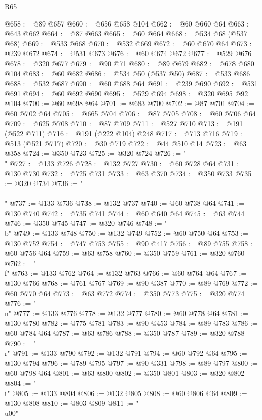 \begin{lexlean}{R65}
\begin{coremodule}
@658 := @89 @657
@660 := @656 @658 @104
@662 := @60 @660 @64
@663 := @643 @662
@664 := @87 @663
@665 := @60 @664
@668 := @534 @68 (@537 @68)
@669 := @533 @668
@670 := @532 @669
@672 := @60 @670 @64
@673 := @239 @672
@674 := @531 @673
@676 := @60 @674 @672
@677 := @529 @676
@678 := @320 @677
@679 := @90 @71
@680 := @89 @679
@682 := @678 @680 @104
@683 := @60 @682
@686 := @534 @50 (@537 @50)
@687 := @533 @686
@688 := @532 @687
@690 := @60 @688 @64
@691 := @239 @690
@692 := @531 @691
@694 := @60 @692 @690
@695 := @529 @694
@698 := @320 @695 @92 @104
@700 := @60 @698 @64
@701 := @683 @700
@702 := @87 @701
@704 := @60 @702 @64
@705 := @665 @704
@706 := @87 @705
@708 := @60 @706 @64
@709 := @625 @708
@710 := @87 @709
@711 := @527 @710
@713 := @191 (@522 @711)
@716 := @191 (@222 @104) @248
@717 := @713 @716
@719 := @513 (@521 @717)
@720 := @30 @719
@722 := @44 @510 @14
@723 := @63 @358
@724 := @350 @723
@725 := @320 @724
@726 := "\\\""
@727 := @133 @726
@728 := @132 @727
@730 := @60 @728 @64
@731 := @130 @730
@732 := @725 @731
@733 := @63 @370
@734 := @350 @733
@735 := @320 @734
@736 := "\\\\"
@737 := @133 @736
@738 := @132 @737
@740 := @60 @738 @64
@741 := @130 @740
@742 := @735 @741
@744 := @60 @640 @64
@745 := @63 @744
@746 := @350 @745
@747 := @320 @746
@748 := "\\b"
@749 := @133 @748
@750 := @132 @749
@752 := @60 @750 @64
@753 := @130 @752
@754 := @747 @753
@755 := @90 @417
@756 := @89 @755
@758 := @60 @756 @64
@759 := @63 @758
@760 := @350 @759
@761 := @320 @760
@762 := "\\f"
@763 := @133 @762
@764 := @132 @763
@766 := @60 @764 @64
@767 := @130 @766
@768 := @761 @767
@769 := @90 @387
@770 := @89 @769
@772 := @60 @770 @64
@773 := @63 @772
@774 := @350 @773
@775 := @320 @774
@776 := "\\n"
@777 := @133 @776
@778 := @132 @777
@780 := @60 @778 @64
@781 := @130 @780
@782 := @775 @781
@783 := @90 @453
@784 := @89 @783
@786 := @60 @784 @64
@787 := @63 @786
@788 := @350 @787
@789 := @320 @788
@790 := "\\r"
@791 := @133 @790
@792 := @132 @791
@794 := @60 @792 @64
@795 := @130 @794
@796 := @789 @795
@797 := @90 @331
@798 := @89 @797
@800 := @60 @798 @64
@801 := @63 @800
@802 := @350 @801
@803 := @320 @802
@804 := "\\t"
@805 := @133 @804
@806 := @132 @805
@808 := @60 @806 @64
@809 := @130 @808
@810 := @803 @809
@811 := "\\u00"

\end{coremodule}
\end{lexlean}
